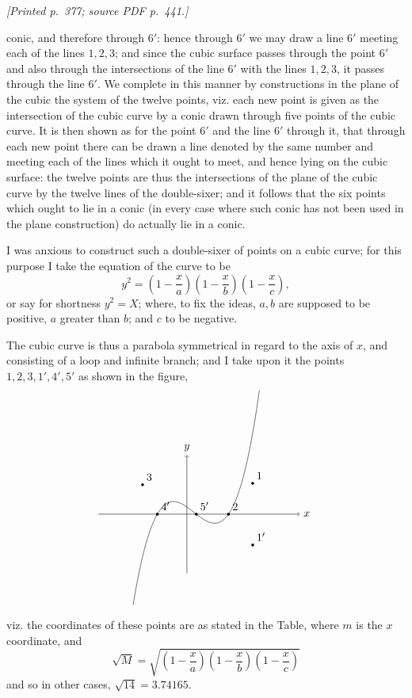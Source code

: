 \documentclass[11pt,a4paper]{article}
\newcommand{\sourcepage}[2]{\par\smallskip\noindent\textit{[Printed p.~#1; source PDF p.~#2.]}\par\smallskip}
\begin{document}
\sourcepage{377}{441}
\noindent
conic, and therefore through $6'$: hence through $6'$ we may draw a line $6'$ meeting
each of the lines $1,2,3$; and since the cubic surface passes through the point $6'$
and also through the intersections of the line $6'$ with the lines $1,2,3$, it passes
through the line $6'$. We complete in this manner by constructions in the plane of
the cubic the system of the twelve points, viz. each new point is given as the
intersection of the cubic curve by a conic drawn through five points of the cubic
curve. It is then shown as for the point $6'$ and the line $6'$ through it, that through
each new point there can be drawn a line denoted by the same number and meeting
each of the lines which it ought to meet, and hence lying on the cubic surface: the
twelve points are thus the intersections of the plane of the cubic curve by the twelve
lines of the double-sixer; and it follows that the six points which ought to lie in a
conic (in every case where such conic has not been used in the plane construction) do
actually lie in a conic.

I was anxious to construct such a double-sixer of points on a cubic curve; for this
purpose I take the equation of the curve to be
\[
y^2=\left(1-\frac{x}{a}\right)\left(1-\frac{x}{b}\right)\left(1-\frac{x}{c}\right),
\]
or say for shortness $y^2=X$; where, to fix the ideas, $a,b$ are supposed to be
positive, $a$ greater than $b$; and $c$ to be negative.

The cubic curve is thus a parabola symmetrical in regard to the axis of $x$, and
consisting of a loop and infinite branch; and I take upon it the points
$1,2,3,1',4',5'$ as shown in the figure,
\[
\begin{tikzpicture}[scale=0.85]
  \draw[->] (-3.3,0)--(4.2,0) node[right] {$x$};
  \draw[->] (0,-2.2)--(0,2.2) node[above] {$y$};
  \draw[domain=-2.0:2.7,smooth,variable=\t,samples=120]
    plot ({\t},{0.45*(\t+1.1)*(\t-0.35)*(\t-1.55)});
  \foreach \x/\y/\lab in {-1.1/0/4',0.35/0/5',1.55/0/2,2.45/1.15/1,2.45/-1.15/1',-1.65/1.1/3}
    \fill (\x,\y) circle (1.5pt) node[above right] {$\lab$};
\end{tikzpicture}
\]
viz. the coordinates of these points are as stated in the Table, where $m$ is the
$x$ coordinate, and
\[
\sqrt{M}=\sqrt{\left(1-\frac{x}{a}\right)
                \left(1-\frac{x}{b}\right)
                \left(1-\frac{x}{c}\right)}
\]
and so in other cases, $\sqrt{14}=3.74165$.
\end{document}
